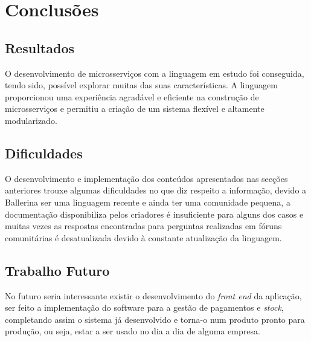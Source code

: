 
\chapter{Conclusões} 	%
\label{Chapter7} 		%




\section{Resultados}
O desenvolvimento de microsserviços com a linguagem em estudo foi conseguida, tendo sido, possível explorar muitas das suas características. A linguagem proporcionou uma experiência agradável e eficiente na construção de microsserviços e permitiu a criação de um sistema flexível e altamente modularizado.

\section{Dificuldades}
O desenvolvimento e implementação dos conteúdos apresentados nas secções anteriores trouxe algumas dificuldades no que diz respeito a informação, devido a Ballerina ser uma linguagem recente e ainda ter uma comunidade pequena, a documentação disponibiliza pelos criadores é insuficiente para alguns dos casos e muitas vezes as respostas encontradas para perguntas realizadas em fóruns comunitárias é desatualizada devido à constante atualização da linguagem.

\section{Trabalho Futuro}
No futuro seria interessante existir o desenvolvimento do \textit{front end} da aplicação, ser feito a implementação do software para a gestão de pagamentos e \textit{stock}, completando assim o sistema já desenvolvido e torna-o num produto pronto para produção, ou seja, estar a ser usado no dia a dia de alguma empresa.



\label{sec:Ch6.1}






